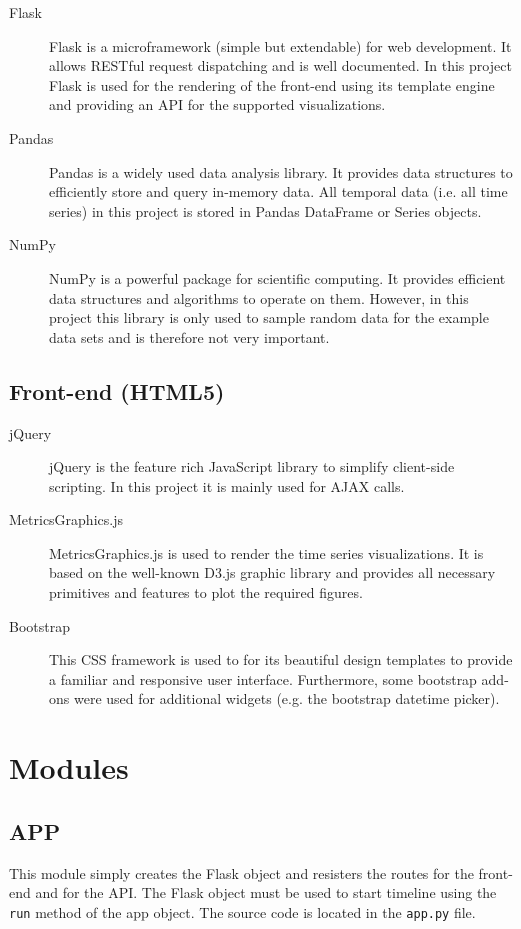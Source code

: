 \documentclass[11pt, a4paper]{article}
\begin{document}
\begin{description}
 \item[Flask] 
 Flask is a microframework (simple but extendable) for web development. 
 It allows RESTful request dispatching and is well documented. 
 In this project Flask is used for the rendering of the front-end using its template engine and providing an API for the supported visualizations.
 
 \item[Pandas] 
 Pandas is a widely used data analysis library. 
 It provides data structures to efficiently store and query in-memory data. 
 All temporal data (i.e. all time series) in this project is stored in Pandas DataFrame or Series objects. 
 
 \item[NumPy] 
 NumPy is a powerful package for scientific computing. 
 It provides efficient data structures and algorithms to operate on them. 
 However, in this project this library is only used to sample random data for the example data sets and is therefore not very important. 
\end{description}


\subsection{Front-end (HTML5)}

\begin{description}
 \item[jQuery] jQuery is the feature rich JavaScript library to simplify client-side scripting. 
 In this project it is mainly used for AJAX calls.
 \item[MetricsGraphics.js] MetricsGraphics.js is used to render the time series visualizations.
 It is based on the well-known D3.js graphic library and provides all necessary primitives and features to plot the required figures.
 \item[Bootstrap] This CSS framework is used to for its beautiful design templates to provide a familiar and responsive user interface.
 Furthermore, some bootstrap add-ons were used for additional widgets (e.g. the bootstrap datetime picker).
\end{description}


\section{Modules}\label{sec:modules}


\subsection{APP}
This module simply creates the Flask object and resisters the routes for the front-end and for the API.
The Flask object must be used to start timeline using the \texttt{run} method of the app object. 
The source code is located in the \texttt{app.py} file.
\end{document}
